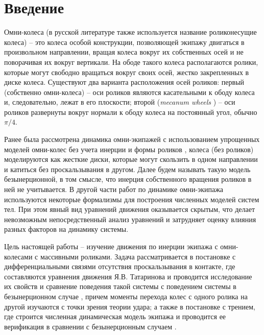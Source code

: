 \section*{Введение}

Омни-колеса (в русской литературе также используется название роликонесущие колеса) -- это колеса особой конструкции, позволяющей экипажу двигаться в произвольном направлении, вращая колеса вокруг их собственных осей и не поворачивая их вокруг вертикали. На ободе такого колеса располагаются ролики, которые могут свободно вращаться вокруг своих осей, жестко закрепленных в диске колеса. Существуют два варианта расположения осей роликов: первый  (собственно омни-колеса) -- оси роликов являются касательными к ободу колеса и, следовательно, лежат в его плоскости; второй (\textit{mecanum wheels} \cite{mecanum}) -- оси роликов развернуты вокруг нормали к ободу колеса на постоянный угол, обычно $\pi/4$.

Ранее была рассмотрена динамика омни-экипажей с использованием упрощенных моделей омни-колес без учета инерции и формы роликов \cite{ZobovaTatarinovPMM, formalskii, borisov, ZobovaTatarinovAspecty2006, zobova2008svobodnye8020851, Martynenko2010}, колеса (без роликов) моделируются как жесткие диски, которые могут скользить в одном направлении и катиться без проскальзывания в другом. Далее будем называть такую модель безынерционной, в том смысле, что инерция собственного вращения роликов в ней не учитывается. В другой части работ по динамике омни-экипажа \cite{KosenkoGerasimov, Tobolar, Williams2002, Ashmore2002} используются некоторые формализмы для построения численных моделей систем тел. При этом явный вид уравнений движения оказывается скрытым, что делает невозможным непосредственный  анализ уравнений и затрудняет оценку влияния разных факторов на динамику системы.

Цель настоящей работы -- изучение движения по инерции экипажа с омни-колесами с массивными роликами. Задача рассматривается в постановке с дифференциальными связями отсутствия проскальзывания в контакте, где составляются уравнения движения Я.В. Татаринова \cite{Tatarinov} и проводится исследование их свойств и сравнение поведения такой системы с поведением системы в безынерционном случае \cite{Zobova2011}, причем моменты перехода колес с одного ролика на другой изучаются с точки зрения теории удара; а также в постановке с трением, где строится численная динамическая модель экипажа и проводится ее верификация в сравнении с безынерционным случаем \cite{borisov}.